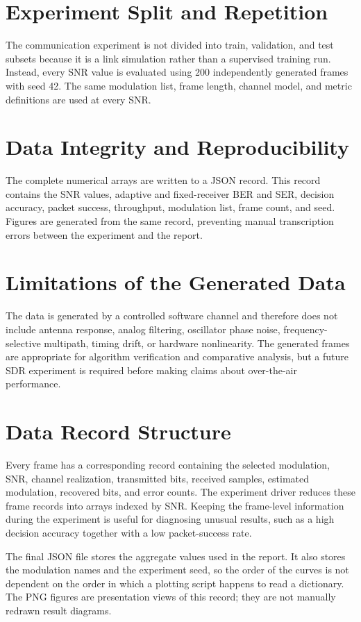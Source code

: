 \documentclass[12pt,twoside,openright]{report}
\begin{document}
\section{Experiment Split and Repetition}
The communication experiment is not divided into train, validation, and test
subsets because it is a link simulation rather than a supervised training
run. Instead, every SNR value is evaluated using 200 independently generated
frames with seed 42. The same modulation list, frame length, channel model,
and metric definitions are used at every SNR.

\section{Data Integrity and Reproducibility}
The complete numerical arrays are written to a JSON record. This record
contains the SNR values, adaptive and fixed-receiver BER and SER, decision
accuracy, packet success, throughput, modulation list, frame count, and seed.
Figures are generated from the same record, preventing manual transcription
errors between the experiment and the report.

\section{Limitations of the Generated Data}
The data is generated by a controlled software channel and therefore does
not include antenna response, analog filtering, oscillator phase noise,
frequency-selective multipath, timing drift, or hardware nonlinearity. The
generated frames are appropriate for algorithm verification and comparative
analysis, but a future SDR experiment is required before making claims about
over-the-air performance.

\section{Data Record Structure}
Every frame has a corresponding record containing the selected modulation,
SNR, channel realization, transmitted bits, received samples, estimated
modulation, recovered bits, and error counts. The experiment driver reduces
these frame records into arrays indexed by SNR. Keeping the frame-level
information during the experiment is useful for diagnosing unusual results,
such as a high decision accuracy together with a low packet-success rate.

The final JSON file stores the aggregate values used in the report. It also
stores the modulation names and the experiment seed, so the order of the
curves is not dependent on the order in which a plotting script happens to
read a dictionary. The PNG figures are presentation views of this record;
they are not manually redrawn result diagrams.
\end{document}
